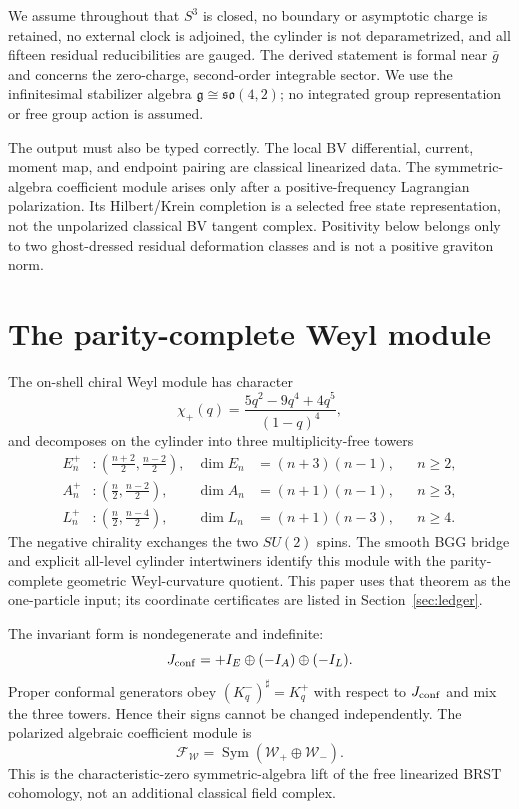 \documentclass[11pt]{article}
\theoremstyle{remark}
\newcommand{\g}{\mathfrak g}
\newcommand{\W}{\mathcal W}
\newcommand{\F}{\mathcal F}
\begin{document}
We assume throughout that $S^3$ is closed, no boundary or asymptotic charge
is retained, no external clock is adjoined, the cylinder is not
deparametrized, and all fifteen residual reducibilities are gauged.  The
derived statement is formal near $\bar g$ and concerns the zero-charge,
second-order integrable sector.  We use the infinitesimal stabilizer algebra
$\g\cong\mathfrak{so}(4,2)$; no integrated group representation or free
group action is assumed.

The output must also be typed correctly.  The local BV differential,
current, moment map, and endpoint pairing are classical linearized data.
The symmetric-algebra coefficient module arises only after a
positive-frequency Lagrangian polarization.  Its Hilbert/Krein completion is
a selected free state representation, not the unpolarized classical BV
tangent complex.  Positivity below belongs only to two ghost-dressed
residual deformation classes and is not a positive graviton norm.

\section{The parity-complete Weyl module}

The on-shell chiral Weyl module has character
\begin{equation}\label{eq:character}
 \chi_+(q)=\frac{5q^2-9q^4+4q^5}{(1-q)^4},
\end{equation}
and decomposes on the cylinder into three multiplicity-free towers
\begin{align}
 E_n^+&:\left(\frac{n+2}{2},\frac{n-2}{2}\right),
 &\dim E_n&=(n+3)(n-1), &&n\ge2,\nonumber\\
 A_n^+&:\left(\frac n2,\frac{n-2}{2}\right),
 &\dim A_n&=(n+1)(n-1), &&n\ge3,\label{eq:EAL}\\
 L_n^+&:\left(\frac n2,\frac{n-4}{2}\right),
 &\dim L_n&=(n+1)(n-3), &&n\ge4.\nonumber
\end{align}
The negative chirality exchanges the two $SU(2)$ spins.  The smooth BGG
bridge and explicit all-level cylinder intertwiners identify this module
with the parity-complete geometric Weyl-curvature quotient.  This paper uses
that theorem as the one-particle input; its coordinate certificates are
listed in Section~\ref{sec:ledger}.

The invariant form is nondegenerate and indefinite:
\begin{equation}\label{eq:krein-one}
 J_{\rm conf}=+I_E\oplus(-I_A)\oplus(-I_L).
\end{equation}
Proper conformal generators obey $(K^-_q)^\sharp=K^+_q$ with respect to
$J_{\rm conf}$ and mix the three towers.  Hence their signs cannot be
changed independently.  The polarized algebraic coefficient module is
\begin{equation}\label{eq:fock-alg}
 \F_{\W}=\operatorname{Sym}(\W_+\oplus\W_-).
\end{equation}
This is the characteristic-zero symmetric-algebra lift of the free
linearized BRST cohomology, not an additional classical field complex.
\end{document}

